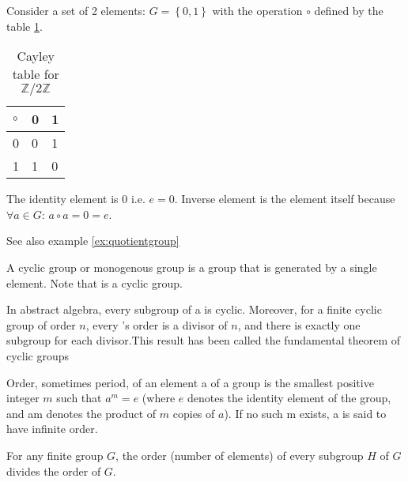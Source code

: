 \begin{appendices}
\begin{example}
  Consider a set of 2 elements: $G = \left\{0, 1\right\}$ with the
  operation $\circ$ defined by the table \ref{tab:CayleyZ2Z}.
  \begin{table}
    \centering
    \caption{Cayley table for $\mathbb{Z}/2\mathbb{Z}$}
    \label{tab:CayleyZ2Z}
    \begin{tabular}{l|ll}
      \toprule
      $\circ$ & 0 & 1 \\
      \midrule
      0 & 0 & 1 \\
      1 & 1 & 0 \\
      \bottomrule
    \end{tabular}
  \end{table}

  The identity element is $0$ i.e. $e = 0$.
  Inverse element is the element itself
  because $\forall a \in G$: $a \circ a = 0 = e$.

  See also example \ref{ex:quotientgroup}
  \label{ex:groupZ2}
\end{example}

\begin{definition}
  A cyclic group or monogenous group is a group that is generated by a
  single element.
  Note that  is a cyclic group.
  \label{def:cyclicgroup}
\end{definition}

\begin{theorem}
  In abstract algebra, every subgroup of a  is
  cyclic. Moreover, for a finite cyclic group of order $n$, every
  's order is a divisor of $n$, and there is
  exactly one subgroup for each divisor.This result has been called the
  fundamental theorem of cyclic groups
  \cite{wiki:subgroups_of_cyclic_groups}
  \label{thm:fundamentaltheoremofcyclicgroup}
\end{theorem}

\begin{definition}
  Order, sometimes period, of an element a of a group is the smallest
  positive integer $m$ such that $a^m = e$ (where $e$ denotes the identity
  element of the group, and am denotes the product of $m$ copies of
  $a$). If no such m exists, a is said to have infinite order.
  \label{def:grouporder}
\end{definition}

\begin{theorem}[Lagrange]
  For any finite group $G$, the order (number of elements) of every
  subgroup $H$ of $G$ divides the order of $G$. 
  \label{thm:lagrange}
\end{theorem}



\end{appendices}
